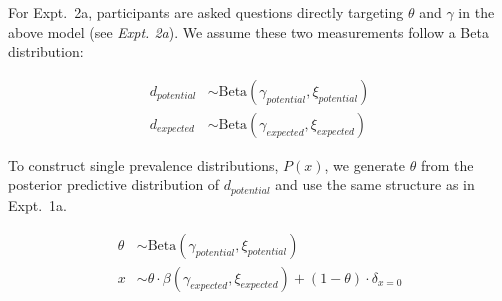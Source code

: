 \documentclass{pnastwo}
\begin{document}
\begin{article}
\begin{materials}
%
For Expt.~2a, participants are asked questions directly targeting $\theta$ and $\gamma$ in the above model (see {\it Expt. 2a}).
We assume these two measurements follow a Beta distribution:\\
%
\begin{minipage}{0.5 \textwidth} \small
\begin{align*}
d_{potential} &\sim \text{Beta}(\gamma_{potential}, \xi_{potential}) \\
d_{expected} &\sim \text{Beta}(\gamma_{expected}, \xi_{expected}) 
\end{align*}
\end{minipage}
%
To construct single prevalence distributions, $P(x)$, we generate $\theta$ from the posterior predictive distribution of $d_{potential}$ and use the same structure as in Expt.~1a.
\begin{minipage}{0.5 \textwidth} \small
\begin{align*}
\theta & \sim \text{Beta}(\gamma_{potential}, \xi_{potential}) \\ 
x	 &  \sim \theta \cdot \beta(\gamma_{expected},\xi_{expected}) + (1-\theta)  \cdot \delta_{x=0}
\end{align*}
\end{minipage}


\end{materials}
\end{article}
\end{document}
